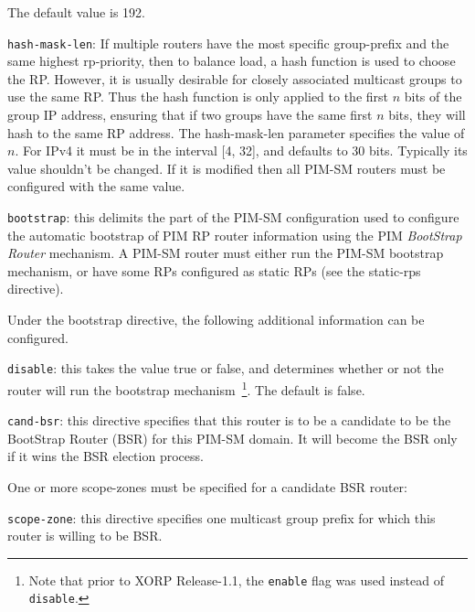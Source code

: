\begin{description}
\begin{description}
\begin{description}
\begin{description}
  The default value is 192.
\item{\tt hash-mask-len}: If multiple routers have the most specific
  {\stt group-prefix} and the same highest {\stt rp-priority}, then to
  balance load, a hash function is used to choose the RP.  However, it
  is usually desirable for closely associated multicast groups to use
  the same RP.  Thus the hash function is only applied to the first
  $n$ bits of the group IP address, ensuring that if two groups have
  the same first $n$ bits, they will hash to the same RP address.  The
  {\stt hash-mask-len} parameter specifies the value of $n$.
  For IPv4 it must be in the interval [4, 32], and defaults to 30 bits.
  Typically its value shouldn't be changed.
  If it is modified then all PIM-SM routers must be configured with the
  same value.
\end{description}
\end{description}
\end{description}
\item{\tt bootstrap}: this delimits the part of the PIM-SM
  configuration used to configure the automatic bootstrap of PIM RP
  router information using the PIM {\it BootStrap Router} mechanism.  A
  PIM-SM router must either run the PIM-SM bootstrap mechanism, or
  have some RPs configured as static RPs (see the {\stt static-rps}
  directive).

  Under the {\stt bootstrap} directive, the following additional
  information can be configured.
\begin{description}
\item{\tt disable}: this takes the value {\stt true} or {\stt false},
  and determines whether or not the router will run the {\stt
  bootstrap} mechanism~\footnote{Note
  that prior to XORP Release-1.1, the {\tt enable} flag was used instead of
  {\tt disable}.}.  The default is {\stt false}.
\item{\tt cand-bsr}: this directive specifies that this router is to
  be a candidate to be the BootStrap Router (BSR) for this PIM-SM domain.
  It will become the BSR only if it wins the BSR election process.

  One or more {\stt scope-zone}s must be specified for a candidate BSR
  router:
\begin{description}
\item{\tt scope-zone}: this directive specifies one multicast group
  prefix for which this router is willing to be BSR. 
 

\end{description}
\end{description}
\end{description}
